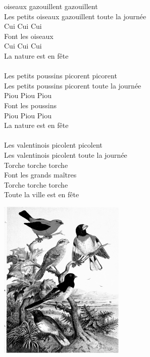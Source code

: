 
 oiseaux gazouillent gazouillent
\\Les petits oiseaux gazouillent toute la journée
\\Cui Cui Cui
\\Font les oiseaux \bissimple
\\Cui Cui Cui
\\La nature est en fête
\\\\Les petits poussins picorent picorent
\\Les petits poussins picorent toute la journée
\\Piou Piou Piou
\\Font les poussins \bissimple
\\Piou Piou Piou
\\La nature est en fête
\\\\Les valentinois picolent picolent
\\Les valentinois picolent toute la journée
\\Torche torche torche
\\Font les grands maîtres \bissimple
\\Torche torche torche
\\Toute la ville est en fête
\bigskip
\bigskip
\begin{center}
\includegraphics[width=0.45\textwidth]{images/brev28.png}
\end{center}

\breakpage